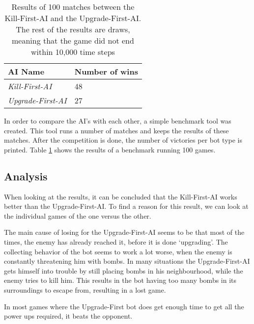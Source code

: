 \begin{table}
\centering
\begin{tabular}{l|l}
\textbf{AI Name} & \textbf{Number of wins}\\\hline
\textit{Kill-First-AI} & 48 \\
\textit{Upgrade-First-AI} & 27\\
\end{tabular}
\caption{Results of 100 matches between the Kill-First-AI and the
Upgrade-First-AI. The rest of the results are draws, meaning that the game did
not end within 10,000 time steps}
\label{tab:results}
\end{table}

In order to compare the AI's with each other, a simple benchmark tool was
created. This tool runs a number of matches and keeps the results of these
matches. After the competition is done, the number of victories per bot type is
printed. Table \ref{tab:results} shows the results of a benchmark running 100
games.

\subsection{Analysis}
When looking at the results, it can be concluded that the Kill-First-AI works
better than the Upgrade-First-AI. To find a reason for this result, we can look
at the individual games of the one versus the other.

The main cause of losing for the Upgrade-First-AI seems to be that most of the
times, the enemy has already reached it, before it is done `upgrading'. The
collecting behavior of the bot seems to work a lot worse, when the enemy is
constantly threatening him with bombs. In many situations the Upgrade-First-AI
gets himself into trouble by still placing bombs in his neighbourhood, while the
enemy tries to kill him. This results in the bot having too many bombs in its
surroundings to escape from, resulting in a lost game. 

In most games where the
Upgrade-First bot does get enough time to get all the power ups required, it beats the
opponent.


